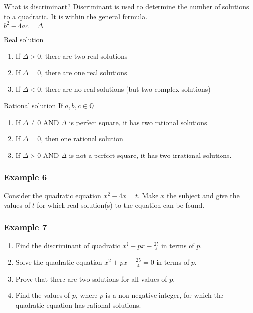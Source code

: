 \documentclass{beamer}
\begin{document}
\begin{frame}{What is discriminant?}
    Discriminant is used to determine the number of solutions to a quadratic. It is within the general formula.\\
    $b^2 - 4ac = \Delta$\\
    \begin{block}{Real solution}
        \begin{enumerate}
            \item If $\Delta >0$, there are two real solutions
            \item If $\Delta =0$, there are one real solutions
            \item If $\Delta <0$, there are no real solutions (but two complex solutions)
        \end{enumerate}
    \end{block}
    \begin{block}{Rational solution}
        If $a,b,c \in \mathbb{Q}$\\
        \begin{enumerate}
            \item If $\Delta \neq 0$ AND $\Delta$ is perfect square, it has two rational solutions
            \item If $\Delta = 0$, then one rational solution
            \item If $\Delta > 0$ AND $\Delta$ is not a perfect square, it has two irrational solutions.
        \end{enumerate}
    \end{block}
\end{frame}

\begin{frame}[t]
    \frametitle{Example 6}
    Consider the quadratic equation $x^2-4x = t$. Make $x$ the subject and give the values of $t$ for which real solution(s) to the equation can be found.
\end{frame}

\begin{frame}[t]
    \frametitle{Example 7}
    \begin{enumerate}
        \item Find the discriminant of quadratic $x^2 + px - \frac{25}{4}$ in terms of $p$.
        \item Solve the quadratic equation $x^2 + px - \frac{25}{4} = 0$ in terms of $p$.
        \item Prove that there are two solutions for all values of $p$.
        \item Find the values of $p$, where $p$ is a non-negative integer, for which the quadratic equation has rational solutions.
    \end{enumerate}
\end{frame}
\end{document}
